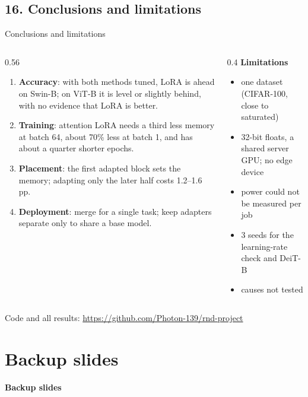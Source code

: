 \documentclass[aspectratio=169,11pt]{beamer}
\begin{document}
\subsection{16. Conclusions and limitations}
\begin{frame}{Conclusions and limitations}
\begin{columns}[T]
\begin{column}{0.56\textwidth}
\small
\begin{enumerate}
  \item \textbf{Accuracy}: with both methods tuned, LoRA is ahead on Swin-B; on ViT-B it is level or slightly behind, with no evidence that LoRA is better.
  \item \textbf{Training}: attention LoRA needs a third less memory at batch 64, about 70\% less at batch 1, and has about a quarter shorter epochs.
  \item \textbf{Placement}: the first adapted block sets the memory; adapting only the later half costs 1.2--1.6 pp.
  \item \textbf{Deployment}: merge for a single task; keep adapters separate only to share a base model.
\end{enumerate}
\end{column}
\begin{column}{0.4\textwidth}
\small
\textbf{Limitations}
\begin{itemize}
  \item one dataset (CIFAR-100, close to saturated)
  \item 32-bit floats, a shared server GPU; no edge device
  \item power could not be measured per job
  \item 3 seeds for the learning-rate check and DeiT-B
  \item causes not tested
\end{itemize}
\end{column}
\end{columns}
\vfill{\centering\scriptsize Code and all results: \url{https://github.com/Photon-139/rnd-project}\par}
\end{frame}

\appendix
\section{Backup slides}
\begin{frame}[plain]
\centering\Large\bfseries\color{cInk} Backup slides
\end{frame}
\end{document}
